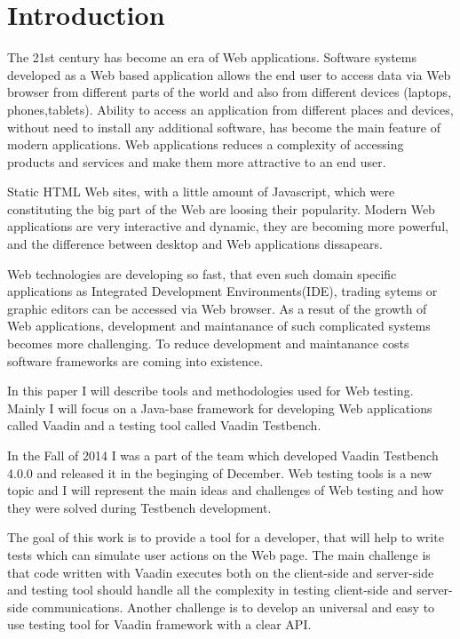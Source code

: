 	
	 \chapter{Introduction}
	 \label{ch:intro} 		
	The 21st century has become an era of Web applications. Software systems
	developed as a Web based application allows the end user to access data via
	Web browser from different parts of the world and also from different devices
	(laptops, phones,tablets). Ability to access an application from different places and
	devices, without need to install any additional software,
	has become the main feature of modern applications. Web applications reduces a
	complexity of accessing products and services and make them more attractive to an end
	user.
	
	Static HTML Web sites, with a little amount of Javascript, which
	were constituting the big part of the Web are loosing their popularity.
	Modern Web	applications are very interactive and dynamic, they are becoming
	more powerful, and the difference between desktop and Web applications
	dissapears. 
	
	Web technologies are developing so fast, that even such domain
	specific applications as Integrated Development Environments(IDE), trading
	sytems or graphic editors can be accessed via Web browser. As a resut of the
	growth of Web applications, development and maintanance of such complicated
	systems becomes more challenging. To reduce development and maintanance costs
	software frameworks are coming into existence.
	
	In this paper I will describe tools and methodologies used for Web testing. Mainly I will focus on a Java-base
	framework for developing Web applications called Vaadin and a testing tool
	called Vaadin Testbench.
	
	 In the Fall of 2014 I was a part of the team which developed Vaadin Testbench
	 4.0.0 and released it in the beginging of December. Web testing tools is a
	 new topic and I will represent the main ideas and challenges
	 of Web testing and how they were solved during Testbench development.
	 
	 The goal of this work is to provide a tool for a developer, that will help to
	 write tests which can simulate user actions on the Web page. The main
	 challenge is that code written with Vaadin executes both on the
	 client-side and server-side and testing tool should handle all the complexity
	 in testing client-side and server-side communications. Another challenge is to
	 develop an universal and easy to use testing tool for Vaadin framework with a
	 clear API.
	 
